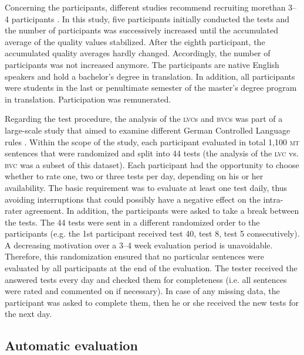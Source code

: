 \documentclass[output=paper]{langsci/langscibook}
\begin{document}
Concerning the participants, different studies recommend recruiting more\linebreak than 3--4 participants \citep{Fiederer2009}. In this study, five participants initially conducted the tests and the number of participants was successively increased until the accumulated average of the quality values stabilized. After the eighth participant, the accumulated quality averages hardly changed. Accordingly, the number of participants was not increased anymore. The participants are native English speakers and hold a bachelor’s degree in translation. In addition, all participants were students in the last or penultimate semester of the master’s degree program in translation. Participation was remunerated.

Regarding the test procedure, the analysis of the \textsc{lvc}s and \textsc{bvc}s was part of a large-scale study that aimed to examine different German Controlled Language rules \citep{Marzouk2019}. Within the scope of the study, each participant evaluated in total 1,100 \textsc{mt} sentences that were randomized and split into 44 tests (the analysis of the \textsc{lvc} vs. \textsc{bvc} was a subset of this dataset). Each participant had the opportunity to choose whether to rate one, two or three tests per day, depending on his or her availability. The basic requirement was to evaluate at least one test daily, thus avoiding interruptions that could possibly have a negative effect on the intra-rater agreement. In addition, the participants were asked to take a break between the tests. The 44 tests were sent in a different randomized order to the participants (e.g. the 1st participant received test 40, test 8, test 5 consecutively). A decreasing motivation over a 3--4 week evaluation period is unavoidable. Therefore, this randomization ensured that no particular sentences were evaluated by all participants at the end of the evaluation. The tester received the answered tests every day and checked them for completeness (i.e. all sentences were rated and commented on if necessary). In case of any missing data, the participant was asked to complete them, then he or she received the new tests for the next day.

\subsection{Automatic evaluation }
\end{document}
